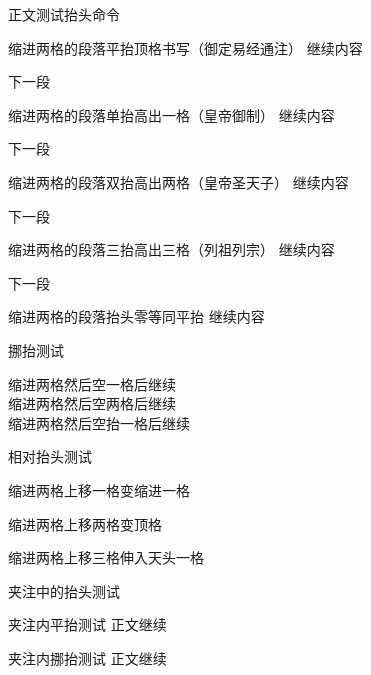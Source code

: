 \documentclass{ltc-guji}
\begin{document}
\begin{正文}
正文测试抬头命令

\begin{段落}[indent=2]
缩进两格的段落 平抬顶格书写（御定易经通注）
继续内容
\end{段落}

下一段

\begin{段落}[indent=2]
缩进两格的段落 单抬高出一格（皇帝御制）
继续内容
\end{段落}

下一段

\begin{段落}[indent=2]
缩进两格的段落 双抬高出两格（皇帝圣天子）
继续内容
\end{段落}

下一段

\begin{段落}[indent=2]
缩进两格的段落 三抬高出三格（列祖列宗）
继续内容
\end{段落}

下一段

\begin{段落}[indent=2]
缩进两格的段落 抬头零等同平抬
继续内容
\end{段落}

挪抬测试

\begin{段落}[indent=2]
缩进两格然后 空一格后继续\\
缩进两格然后 空两格后继续\\
缩进两格然后 空抬一格后继续
\end{段落}

相对抬头测试

\begin{段落}[indent=2]
缩进两格 上移一格变缩进一格
\end{段落}

\begin{段落}[indent=2]
缩进两格 上移两格变顶格
\end{段落}

\begin{段落}[indent=2]
缩进两格 上移三格伸入天头一格
\end{段落}

夹注中的抬头测试

\begin{段落}[indent=2]
夹注内平抬测试
正文继续
\end{段落}

\begin{段落}[indent=2]
夹注内挪抬测试
正文继续
\end{段落}

\end{正文}
\end{document}
